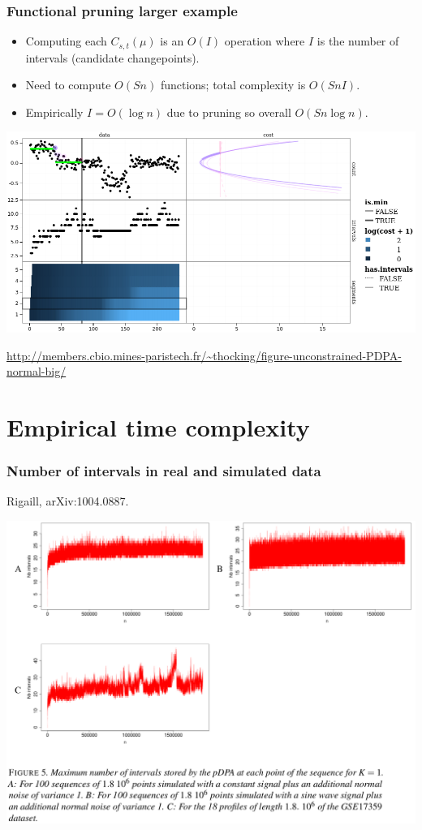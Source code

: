 \documentclass{beamer}
\begin{document}
\begin{frame}
  \frametitle{Functional pruning larger example}

  \begin{itemize}
  \item Computing each $C_{s,t}(\mu)$ is an $O(I)$ operation where $I$
    is the number of intervals (candidate changepoints).
  \item Need to compute $O(Sn)$ functions; total complexity is $O(SnI)$.
  \item Empirically $I=O(\log n)$ due to pruning so overall $O(Sn\log n)$.
  \end{itemize}

\includegraphics[width=\textwidth]{screenshot-PDPA-demo}
%    

\url{http://members.cbio.mines-paristech.fr/~thocking/figure-unconstrained-PDPA-normal-big/}
\end{frame}

\section{Empirical time complexity}

\begin{frame}
  \frametitle{Number of intervals in real and simulated data}
  Rigaill, arXiv:1004.0887.

  \includegraphics[width=\textwidth]{screenshot-figure-5}
\end{frame}
\end{document}
